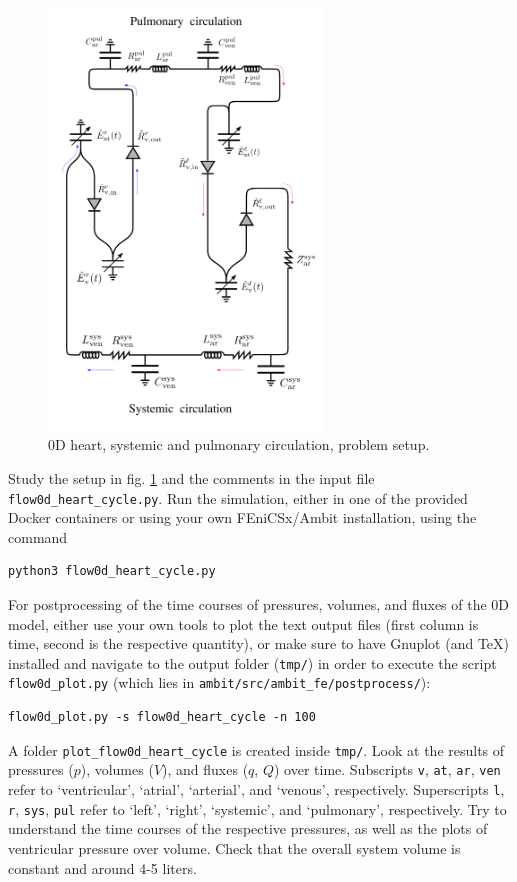 \documentclass[a4paper,12pt]{report}
\begin{document}
\begin{figure}
\centering
\includegraphics[width=0.65\textwidth]{fig/syspul_setup.png}
\caption{0D heart, systemic and pulmonary circulation, problem setup.}
\label{fig:syspul_setup}
\end{figure}

Study the setup in fig. \ref{fig:syspul_setup} and the comments in the input file \verb"flow0d_heart_cycle.py". Run the simulation, either in one of the provided Docker containers or using your own FEniCSx/Ambit installation, using the command
\begin{verbatim}
python3 flow0d_heart_cycle.py
\end{verbatim}

For postprocessing of the time courses of pressures, volumes, and fluxes of the 0D model, either use your own tools to plot the text output files (first column is time, second is the respective quantity), or make sure to have Gnuplot (and TeX) installed and navigate to the output folder (\verb"tmp/") in order to execute the script \verb"flow0d_plot.py" (which lies in \verb"ambit/src/ambit_fe/postprocess/"):
\begin{verbatim}
flow0d_plot.py -s flow0d_heart_cycle -n 100
\end{verbatim}
A folder \verb"plot_flow0d_heart_cycle" is created inside \verb"tmp/". Look at the results of pressures ($p$), volumes ($V$), and fluxes ($q$, $Q$) over time.
Subscripts \verb"v", \verb"at", \verb"ar", \verb"ven" refer to `ventricular', `atrial', `arterial', and `venous', respectively. Superscripts \verb"l", \verb"r", \verb"sys", \verb"pul" refer to `left', `right', `systemic', and
`pulmonary', respectively.
Try to understand the time courses of the respective pressures, as well as the plots of ventricular pressure over volume.
Check that the overall system volume is constant and around 4-5 liters.\\
\end{document}
